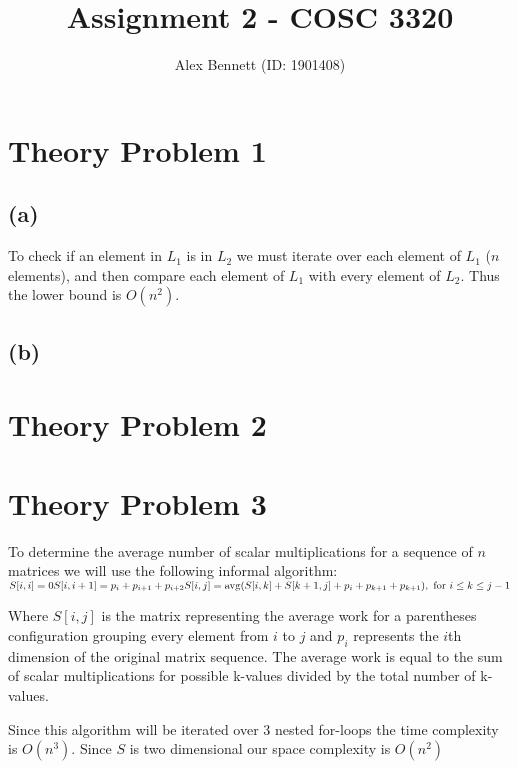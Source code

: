 \documentclass[11pt]{article}
\title{Assignment 2 - COSC 3320}
\author{Alex Bennett (ID: 1901408)}
\date{}
\begin{document}
\maketitle

\section*{Theory Problem 1}

\subsection*{(a)}
To check if an element in $L_1$ is in $L_2$ we must iterate over each element of $L_1$ ($n$ elements), and then compare each element of $L_1$ with every element of $L_2$. Thus the lower bound is $O(n^2)$.

\subsection*{(b)}

\section*{Theory Problem 2}

\section*{Theory Problem 3}

To determine the average number of scalar multiplications for a sequence of $n$ matrices we will use the following informal algorithm:
$\\ \\ S[i,i] = 0 \\
S[i,i+1] = p_i + p_{i+1} + p_{i+2} \\
S[i,j] = \operatorname{avg}(S[i,k] + S[k+1,j] + p_i + p_{k+1} + p_{k+1}), \text{ for } i \leq k \leq j-1 \\ $

Where $S[i,j]$ is the matrix representing the average work for a parentheses configuration grouping every element from $i$ to $j$ and $p_i$ represents the $i$th dimension of the original matrix sequence. The average work is equal to the sum of scalar multiplications for possible k-values divided by the total number of k-values.

Since this algorithm will be iterated over 3 nested for-loops the time complexity is $O(n^3)$. Since $S$ is two dimensional our space complexity is $O(n^2)$
\end{document}
